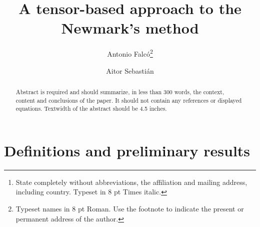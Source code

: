 \documentclass{ws-m3as}
\begin{document}

%
\catchline{}{}{}{}{}
%

\title{A tensor-based approach to the Newmark's method
}

\author{Antonio Falcó\footnote{Typeset names in 8 pt Roman. Use the footnote to indicate the present or permanent address of the author.}}

\address{Departamento de Matemáticas, Física y Ciencias Tecnológicas, Universidad Cardenal Herrera-CEU\\
Alfara del Patriarca, Valencia, Spain\footnote{State completely without abbreviations, the
affiliation and mailing address, including country. Typeset in 8 pt
Times italic.}\\
afalco@uchceu.es}

\author{Aitor Sebastián}

\address{Departamento de Matemáticas, Física y Ciencias Tecnológicas, Universidad Cardenal Herrera-CEU\\
Alfara del Patriarca, Valencia, Spain\\
aitor.sebastiancastaner@uchceu.es}

\maketitle

\begin{history}
\end{history}

\begin{abstract}
Abstract is required and should summarize, in less
than 300 words, the context, content and conclusions of the
paper. It should not contain any references or displayed
equations.  Textwidth of the abstract should be 4.5 inches.
\end{abstract}





\section{Definitions and preliminary results}
\end{document}
